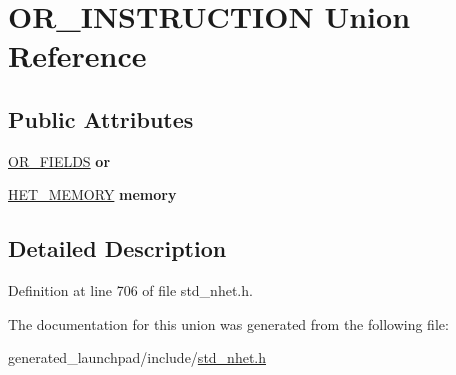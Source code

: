 \hypertarget{unionOR__INSTRUCTION}{}\section{O\+R\+\_\+\+I\+N\+S\+T\+R\+U\+C\+T\+I\+ON Union Reference}
\label{unionOR__INSTRUCTION}
\subsection*{Public Attributes}
\begin{DoxyCompactItemize}
\item 
\mbox{\label{unionOR__INSTRUCTION_a5fa3558c1a8ac3047d327c7bd97f6bc4}} 
\mbox{\hyperlink{structOR__format}{O\+R\+\_\+\+F\+I\+E\+L\+DS}} {\bfseries or}
\item 
\mbox{\label{unionOR__INSTRUCTION_a1fffd8016355e6c994cc8c2509d3a272}} 
\mbox{\hyperlink{structmemory__format}{H\+E\+T\+\_\+\+M\+E\+M\+O\+RY}} {\bfseries memory}
\end{DoxyCompactItemize}


\subsection{Detailed Description}


Definition at line 706 of file std\+\_\+nhet.\+h.



The documentation for this union was generated from the following file\+:\begin{DoxyCompactItemize}
\item 
generated\+\_\+launchpad/include/\mbox{\hyperlink{std__nhet_8h}{std\+\_\+nhet.\+h}}\end{DoxyCompactItemize}
